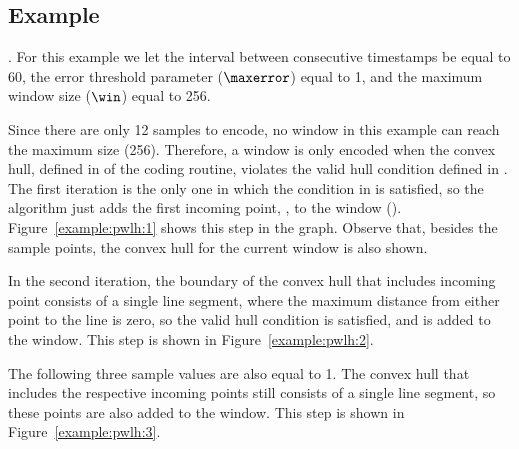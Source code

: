 




\clearpage


\subsection{Example}
\label{algo:pwlh:example}
\newcommand{\exampleIntro}[1]{\exampleIntroFirst{#1}. For this example we let the interval between consecutive timestamps be equal to 60, the error threshold parameter ($\maxerror$) equal to 1, and the maximum window size ($\win$) equal to 256.}


\exampleIntro{\ref{example:pwlh:1}}


Since there are only 12 samples to encode, no window in this example can reach the maximum size (256). Therefore, a window is only encoded when the convex hull, defined in  of the coding routine, violates the valid hull condition defined in . The first iteration is the only one in which the condition in  is satisfied, so the algorithm just adds the first incoming point, , to the window (). Figure~\ref{example:pwlh:1} shows this step in the graph. Observe that, besides the sample points, the convex hull for the current window is also shown.


\vspace{+5pt}


\newcommand{\widthh}{\textit{distance}}
In the second iteration, the boundary of the convex hull that includes incoming point  consists of a single line segment, where the maximum distance from either point to the line is zero, so the valid hull condition is satisfied, and  is added to the window. This step is shown in Figure~\ref{example:pwlh:2}.




\clearpage


The following three sample values are also equal to 1. The convex hull that includes the respective incoming points still consists of a single line segment, so these points are also added to the window. This step is shown in Figure~\ref{example:pwlh:3}.


